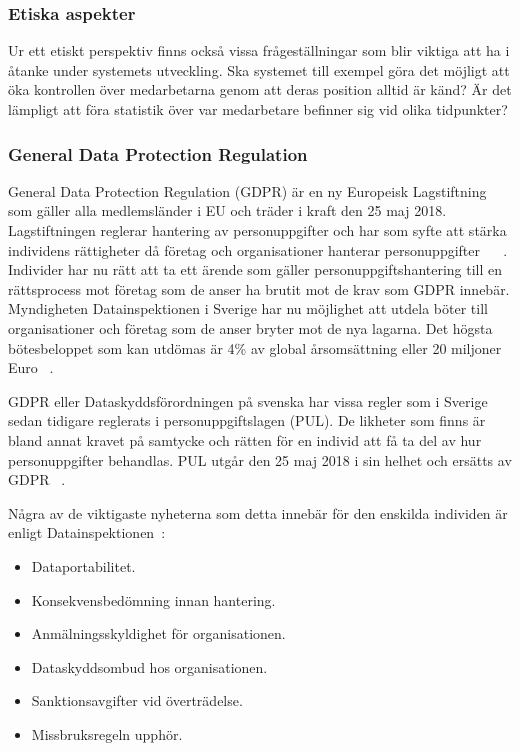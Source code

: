 \documentclass[a4paper,12pt]{article}
\begin{document}
 \subsubsection{Etiska aspekter}
 Ur ett etiskt perspektiv finns också vissa frågeställningar som blir viktiga att ha i åtanke under systemets utveckling. Ska systemet till exempel göra det möjligt att öka kontrollen över medarbetarna genom att deras position alltid är känd? Är det lämpligt att föra statistik över var medarbetare befinner sig vid olika tidpunkter?

 \subsubsection{General Data Protection Regulation}\label{GDPR}
 General Data Protection Regulation (GDPR) är en ny Europeisk Lagstiftning som gäller alla medlemsländer i EU och träder i kraft den 25 maj 2018.
 Lagstiftningen reglerar hantering av personuppgifter och har som syfte att stärka individens rättigheter då företag och organisationer hanterar personuppgifter ~\cite{GDPRibm} ~\cite{GDPRdatainspektionen}.
 Individer har nu rätt att ta ett ärende som gäller personuppgiftshantering till en rättsprocess mot företag som de anser ha brutit mot de krav som GDPR innebär.
 Myndigheten Datainspektionen i Sverige har nu möjlighet att utdela böter till organisationer och företag som de anser bryter mot de nya lagarna. Det högsta bötesbeloppet som kan utdömas är 4\% av global årsomsättning eller 20 miljoner Euro ~\cite{GDPRibm}.

 GDPR eller Dataskyddsförordningen på svenska har vissa regler som i Sverige sedan tidigare reglerats i personuppgiftslagen (PUL). De likheter som finns är bland annat kravet på samtycke och rätten för en individ att få ta del av hur personuppgifter behandlas. PUL utgår den 25 maj 2018 i sin helhet och ersätts av GDPR ~\cite{GDPRdatainspektionen}.

 Några av de viktigaste nyheterna som detta innebär för den enskilda individen är enligt Datainspektionen~\cite{GDPRdatainspektionen}:
 \begin{itemize}
   \item Dataportabilitet.
   \item Konsekvensbedömning innan hantering.
   \item Anmälningsskyldighet för organisationen.
   \item Dataskyddsombud hos organisationen.
   \item Sanktionsavgifter vid överträdelse.
   \item Missbruksregeln upphör.
 \end{itemize}
\end{document}
